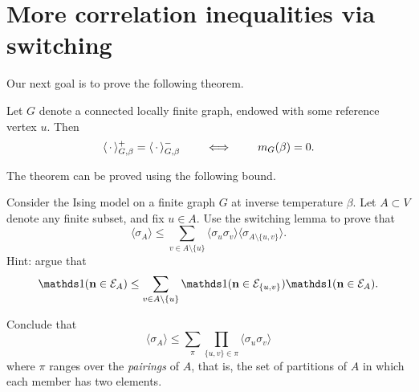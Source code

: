 \section{More correlation inequalities via switching}
\label{sec:vanishing_magnetisation}

Our next goal is to prove the following theorem.

\begin{theorem} 
    \label{thm:vanishing_magnetisation}
    Let $G$ denote a connected locally finite graph,
    endowed with some reference vertex $u$.
    Then 
    \[
        \langle\,\cdot\,\rangle_{G,\beta}^+=\langle\,\cdot\,\rangle_{G,\beta}^-
        \qquad
        \iff 
        \qquad
        m_G(\beta)=0.
    \]
\end{theorem}

The theorem can be proved using the following bound.

\begin{exercise}
    Consider the Ising model on a finite graph $G$ at inverse temperature $\beta$.
    Let $A\subset V$ denote any finite subset,
    and fix $u\in A$.
    Use the switching lemma to prove that
    \[
        \langle\sigma_A\rangle \leq
        \sum_{v\in A\setminus\{u\}}
        \langle\sigma_u\sigma_v\rangle
        \langle\sigma_{A\setminus\{u,v\}}\rangle.
    \]
    Hint: argue that
    \[
        \true{\n\in\calE_A}
        \leq
        \sum_{v\in A\setminus\{u\}}
        \true{\n\in\calE_{\{u,v\}}}
        \true{\n\in\calE_A}.
    \]

    Conclude that
    \[
        \langle\sigma_A\rangle \leq
        \sum_{\pi}
        \prod_{\{u,v\}\in \pi}
        \langle\sigma_u\sigma_v\rangle
    \]
    where $\pi$ ranges over the \emph{pairings} of $A$,
    that is, the set of partitions of $A$ in which each member has two elements.
\end{exercise}


